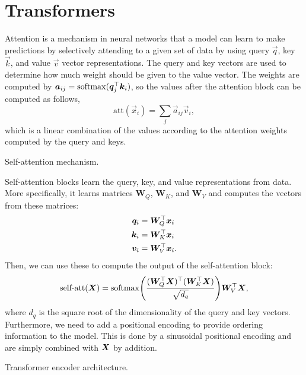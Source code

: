 \section{Transformers} \label{sec:transformers}

Attention is a mechanism in neural networks that a model can learn to make
predictions by selectively attending to a given set of data by using query
$\vec{q}$, key $\vec{k}$, and value $\vec{v}$ vector representations. The query
and key vectors are used to determine how much weight should be given to the
value vector. The weights are computed by
$\bm{a}_{ij}=\mathrm{softmax}(\bm{q}_j^\top\bm{k}_i)$, so the values after the
attention block can be computed as follows, \[
  \text{att}(\vec{x}_i) = \sum_{j} \vec{a}_{ij} \vec{v}_i
,\]
which is a linear combination of the values according to the attention weights
computed by the query and keys.

\begin{marginfigure}
    \centering
    \caption{Self-attention mechanism.}
    \label{fig:attention}
\end{marginfigure}

Self-attention blocks learn the query, key, and value representations from
data. More specifically, it learns matrices $\bm{W}_Q$, $\bm{W}_K$, and
$\bm{W}_V$ and computes the vectors from these matrices:
\begin{align*}
  \bm{q}_i &= \bm{W}_Q^\top \bm{x}_i \\
  \bm{k}_i &= \bm{W}_K^\top \bm{x}_i \\
  \bm{v}_i &= \bm{W}_V^\top \bm{x}_i
.\end{align*}
Then, we can use these to compute the output of the self-attention block: \[
  \text{self-att}(\mat{X}) = \softmax \lft( \frac{\transpose{(\transpose{\mat{W}_Q} \mat{X})}(\transpose{\mat{W}_K}\mat{X})}{\sqrt{d_q}} \rgt) \transpose{\mat{W}_V}\mat{X}
,\]
where $d_q$ is the square root of the dimensionality of the query and key
vectors. Furthermore, we need to add a positional encoding to provide ordering
information to the model. This is done by a sinusoidal positional encoding and are simply
combined with $\bm{X}$ by addition.

\begin{marginfigure}
    \centering
    \caption{Transformer encoder architecture.}
    \label{fig:transformer}
\end{marginfigure}

